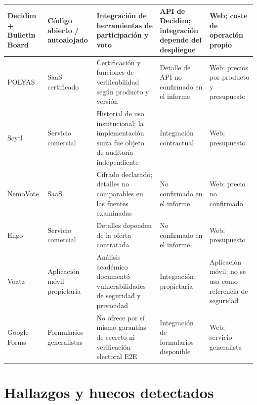 \begin{longtable}{|p{}|p{}|p{}|p{}|p{}|}
\hline
Decidim + Bulletin Board \citep{decidim2026,vocdonidecidim2026} & Código abierto / autoalojado & Integración de herramientas de participación y voto & API de Decidim; integración depende del despliegue & Web; coste de operación propio \\
\hline
POLYAS \citep{polyas2026pricing,polyas2026security} & SaaS certificado & Certificación y funciones de verificabilidad según producto y versión & Detalle de API no confirmado en el informe & Web; precios por producto y presupuesto \\
\hline
Scytl \citep{uabscytl2026,scytl2019espanol,scytl2024liquidacion,scytl2024elnacional,haines2020swisspost} & Servicio comercial & Historial de uso institucional; la implementación suiza fue objeto de auditoría independiente & Integración contractual & Web; presupuesto \\
\hline
NemoVote \citep{nemovote2026} & SaaS & Cifrado declarado; detalles no comparables en las fuentes examinadas & No confirmado en el informe & Web; precio no confirmado \\
\hline
Eligo \citep{eligo2026} & Servicio comercial & Detalles dependen de la oferta contratada & No confirmado en el informe & Web; presupuesto \\
\hline
Voatz \citep{specter2020voatz} & Aplicación móvil propietaria & Análisis académico documentó vulnerabilidades de seguridad y privacidad & Integración propietaria & Aplicación móvil; no se usa como referencia de seguridad \\
\hline
Google Forms \citep{googleforms2026} & Formularios generalistas & No ofrece por sí mismo garantías de secreto ni verificación electoral E2E & Integración de formularios disponible & Web; servicio generalista \\
\hline
\end{longtable}
\setlength{\tabcolsep}{6pt}
\normalsize

\section{Hallazgos y huecos detectados}
\label{sec:huecos-mercado}


